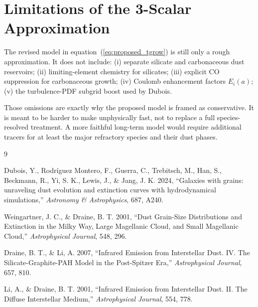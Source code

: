 \documentclass[11pt]{article}
\begin{document}
\section{Limitations of the 3-Scalar Approximation}

The revised model in equation~(\ref{eq:proposed_tgrow}) is still only a rough approximation. It does not include: (i) separate silicate and carbonaceous dust reservoirs; (ii) limiting-element chemistry for silicates; (iii) explicit CO suppression for carbonaceous growth; (iv) Coulomb enhancement factors $E_i(a)$; (v) the turbulence-PDF subgrid boost used by Dubois.

Those omissions are exactly why the proposed model is framed as conservative. It is meant to be harder to make unphysically fast, not to replace a full species-resolved treatment. A more faithful long-term model would require additional tracers for at least the major refractory species and their dust phases.

\begin{thebibliography}{9}

Dubois, Y., Rodr\'iguez Montero, F., Guerra, C., Trebitsch, M., Han, S., Beckmann, R., Yi, S. K., Lewis, J., \& Jang, J. K. 2024,
\newblock ``Galaxies with grains: unraveling dust evolution and extinction curves with hydrodynamical simulations,''
\newblock \emph{Astronomy \& Astrophysics}, 687, A240.

Weingartner, J. C., \& Draine, B. T. 2001,
\newblock ``Dust Grain-Size Distributions and Extinction in the Milky Way, Large Magellanic Cloud, and Small Magellanic Cloud,''
\newblock \emph{Astrophysical Journal}, 548, 296.

Draine, B. T., \& Li, A. 2007,
\newblock ``Infrared Emission from Interstellar Dust. IV. The Silicate-Graphite-PAH Model in the Post-Spitzer Era,''
\newblock \emph{Astrophysical Journal}, 657, 810.

Li, A., \& Draine, B. T. 2001,
\newblock ``Infrared Emission from Interstellar Dust. II. The Diffuse Interstellar Medium,''
\newblock \emph{Astrophysical Journal}, 554, 778.

\end{thebibliography}
\end{document}
